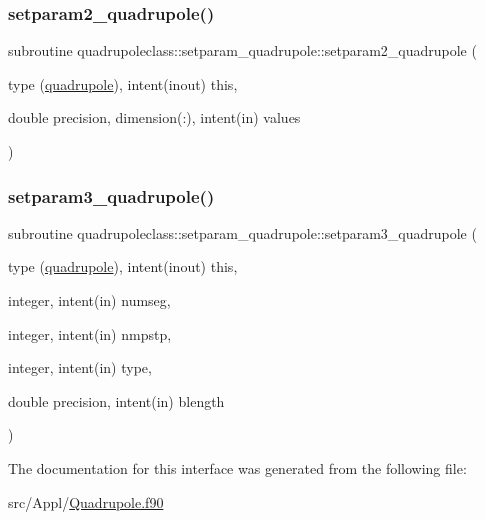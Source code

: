 \mbox{\label{interfacequadrupoleclass_1_1setparam__quadrupole_a0afeab566ad2a8d00552ba6cd402943d}} 
\subsubsection{\texorpdfstring{setparam2\_quadrupole()}{setparam2\_quadrupole()}}
{\footnotesize\ttfamily subroutine quadrupoleclass\+::setparam\+\_\+quadrupole\+::setparam2\+\_\+quadrupole (\begin{DoxyParamCaption}\item[{type (\mbox{\hyperlink{namespacequadrupoleclass_structquadrupoleclass_1_1quadrupole}{quadrupole}}), intent(inout)}]{this,  }\item[{double precision, dimension(\+:), intent(in)}]{values }\end{DoxyParamCaption})}

\mbox{\label{interfacequadrupoleclass_1_1setparam__quadrupole_a9efeed4d7a1e905ae01a5efa85c514cf}} 
\subsubsection{\texorpdfstring{setparam3\_quadrupole()}{setparam3\_quadrupole()}}
{\footnotesize\ttfamily subroutine quadrupoleclass\+::setparam\+\_\+quadrupole\+::setparam3\+\_\+quadrupole (\begin{DoxyParamCaption}\item[{type (\mbox{\hyperlink{namespacequadrupoleclass_structquadrupoleclass_1_1quadrupole}{quadrupole}}), intent(inout)}]{this,  }\item[{integer, intent(in)}]{numseg,  }\item[{integer, intent(in)}]{nmpstp,  }\item[{integer, intent(in)}]{type,  }\item[{double precision, intent(in)}]{blength }\end{DoxyParamCaption})}



The documentation for this interface was generated from the following file\+:\begin{DoxyCompactItemize}
\item 
src/\+Appl/\mbox{\hyperlink{_quadrupole_8f90}{Quadrupole.\+f90}}\end{DoxyCompactItemize}
